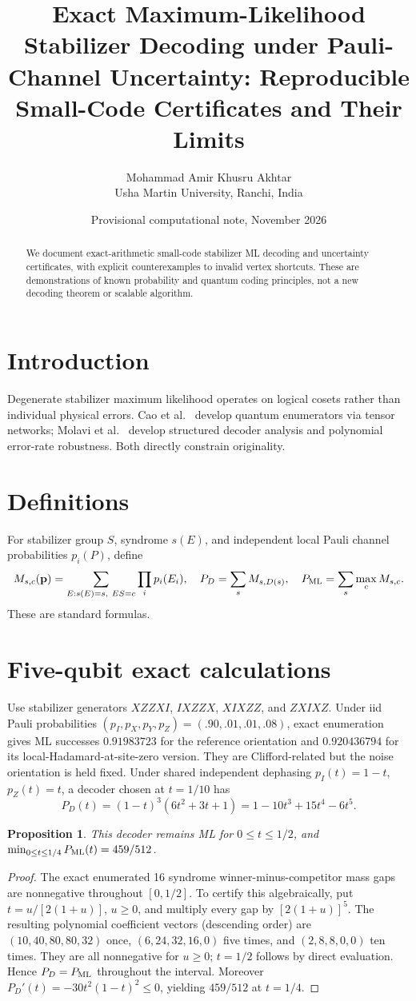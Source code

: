 \documentclass{article}
\title{Exact Maximum-Likelihood Stabilizer Decoding under Pauli-Channel Uncertainty: Reproducible Small-Code Certificates and Their Limits}
\author{Mohammad Amir Khusru Akhtar\\Usha Martin University, Ranchi, India}
\date{Provisional computational note, November 2026}
\newtheorem{proposition}{Proposition}
\begin{document}
\maketitle
\begin{abstract}We document exact-arithmetic small-code stabilizer ML decoding and uncertainty certificates, with explicit counterexamples to invalid vertex shortcuts. These are demonstrations of known probability and quantum coding principles, not a new decoding theorem or scalable algorithm.\end{abstract}
\section{Introduction}
Degenerate stabilizer maximum likelihood operates on logical cosets rather than individual physical errors. Cao et al.~\cite{cao} develop quantum enumerators via tensor networks; Molavi et al.~\cite{molavi} develop structured decoder analysis and polynomial error-rate robustness. Both directly constrain originality.
\section{Definitions}
For stabilizer group $S$, syndrome $s(E)$, and independent local Pauli channel probabilities $p_i(P)$, define
\[
M_{s,c}(\mathbf p)=\sum_{E:s(E)=s,\ ES=c}\prod_i p_i(E_i),
\quad P_D=\sum_sM_{s,D(s)},\quad P_{\rm ML}=\sum_s\max_c M_{s,c}.
\]
These are standard formulas.
\section{Five-qubit exact calculations}
Use stabilizer generators $XZZXI$, $IXZZX$, $XIXZZ$, and $ZXIXZ$. Under iid Pauli probabilities $(p_I,p_X,p_Y,p_Z)=(.90,.01,.01,.08)$, exact enumeration gives ML successes $0.91983723$ for the reference orientation and $0.920436794$ for its local-Hadamard-at-site-zero version. They are Clifford-related but the noise orientation is held fixed.
Under shared independent dephasing $p_I(t)=1-t$, $p_Z(t)=t$, a decoder chosen at $t=1/10$ has
\[
P_D(t)=(1-t)^3(6t^2+3t+1)=1-10t^3+15t^4-6t^5.
\]
\begin{proposition}This decoder remains ML for $0\le t\le 1/2$, and $\min_{0\le t\le1/4}P_{\rm ML}(t)=459/512$.\end{proposition}
\begin{proof}
The exact enumerated 16 syndrome winner-minus-competitor mass gaps are nonnegative throughout $[0,1/2]$. To certify this algebraically, put $t=u/[2(1+u)]$, $u\ge0$, and multiply every gap by $[2(1+u)]^5$. The resulting polynomial coefficient vectors (descending order) are $(10,40,80,80,32)$ once, $(6,24,32,16,0)$ five times, and $(2,8,8,0,0)$ ten times. They are all nonnegative for $u\ge0$; $t=1/2$ follows by direct evaluation. Hence $P_D=P_{\rm ML}$ throughout the interval. Moreover $P_D'(t)=-30t^2(1-t)^2\le0$, yielding $459/512$ at $t=1/4$.
\end{proof}
\end{document}
